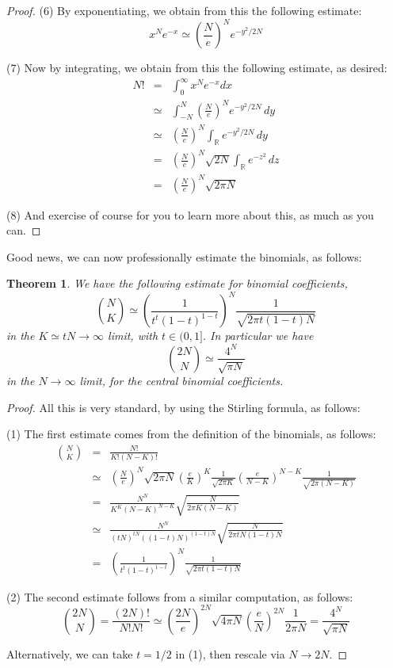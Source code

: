 \documentclass[12pt]{amsbook}
\newtheorem{theorem}{Theorem}[chapter]
\begin{document}
\begin{proof}
(6) By exponentiating, we obtain from this the following estimate:
$$x^Ne^{-x}\simeq\left(\frac{N}{e}\right)^Ne^{-y^2/2N}$$

(7) Now by integrating, we obtain from this the following estimate, as desired:
\begin{eqnarray*}
N!
&=&\int_0^\infty x^Ne^{-x}dx\\
&\simeq&\int_{-N}^N\left(\frac{N}{e}\right)^Ne^{-y^2/2N}\,dy\\
&\simeq&\left(\frac{N}{e}\right)^N\int_\mathbb Re^{-y^2/2N}\,dy\\
&=&\left(\frac{N}{e}\right)^N\sqrt{2N}\int_\mathbb Re^{-z^2}\,dz\\
&=&\left(\frac{N}{e}\right)^N\sqrt{2\pi N}
\end{eqnarray*}

(8) And exercise of course for you to learn more about this, as much as you can.
\end{proof}

Good news, we can now professionally estimate the binomials, as follows:


\begin{theorem}
We have the following estimate for binomial coefficients,
$$\binom{N}{K}\simeq\left(\frac{1}{t^t(1-t)^{1-t}}\right)^N\frac{1}{\sqrt{2\pi t(1-t)N}}$$
in the $K\simeq tN\to\infty$ limit, with $t\in(0,1]$. In particular we have
$$\binom{2N}{N}\simeq\frac{4^N}{\sqrt{\pi N}}$$
in the $N\to\infty$ limit, for the central binomial coefficients.
\end{theorem}

\begin{proof}
All this is very standard, by using the Stirling formula, as follows:

\medskip

(1) The first estimate comes from the definition of the binomials, as follows:
\begin{eqnarray*}
\binom{N}{K}
&=&\frac{N!}{K!(N-K)!}\\
&\simeq&\left(\frac{N}{e}\right)^N\sqrt{2\pi N}\left(\frac{e}{K}\right)^K\frac{1}{\sqrt{2\pi K}}\left(\frac{e}{N-K}\right)^{N-K}\frac{1}{\sqrt{2\pi(N-K)}}\\
&=&\frac{N^N}{K^K(N-K)^{N-K}}\sqrt{\frac{N}{2\pi K(N-K)}}\\
&\simeq&\frac{N^N}{(tN)^{tN}((1-t)N)^{(1-t)N}}\sqrt{\frac{N}{2\pi tN(1-t)N}}\\
&=&\left(\frac{1}{t^t(1-t)^{1-t}}\right)^N\frac{1}{\sqrt{2\pi t(1-t)N}}
\end{eqnarray*}

(2) The second estimate follows from a similar computation, as follows:
$$\binom{2N}{N}
=\frac{(2N)!}{N!N!}
\simeq\left(\frac{2N}{e}\right)^{2N}\sqrt{4\pi N}\left(\frac{e}{N}\right)^{2N}\frac{1}{2\pi N}
=\frac{4^N}{\sqrt{\pi N}}$$

Alternatively, we can take $t=1/2$ in (1), then rescale via $N\to 2N$.
\end{proof}
\end{document}
